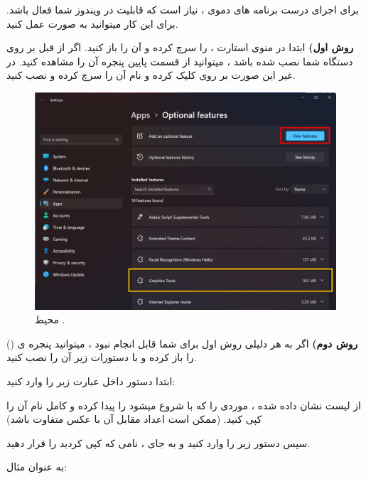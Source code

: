 {
    \Large
    برای اجرای درست برنامه های دموی  ، نیاز است که قابلیت  در ویندوز شما فعال باشد.
    برای این کار میتوانید به صورت عمل کنید.

    \textbf{روش اول)}
    ابتدا در منوی استارت ،  را سرچ کرده و آن را باز کنید.
    اگر  از قبل بر روی دستگاه شما نصب شده باشد ، میتوانید از قسمت پایین پنجره آن را مشاهده کنید.
    در غیر این صورت بر روی  کلیک کرده و نام آن را سرچ کرده و نصب کنید.

    \begin{figure}[H]
        \centering
        \setlength{\belowcaptionskip}{-10pt}
        \includegraphics[width=\textwidth]{Images/1.Intro.4.1.png}
        \caption{محیط .}
    \end{figure}

    \textbf{روش دوم)}
    اگر به هر دلیلی روش اول برای شما قابل انجام نبود ، میتوانید پنجره ی  () را باز کرده و با دستورات زیر آن را نصب کنید.

    ابتدا دستور داخل  عبارت زیر را وارد کنید:

    \begin{flushleft}
    \end{flushleft}

    از لیست نشان داده شده ، موردی را که با  شروع میشود را پیدا کرده و کامل نام آن را کپی کنید. (ممکن است اعداد مقابل آن با عکس متفاوت باشد)

    سپس دستور زیر را وارد کنید و به جای  ، نامی که کپی کردید را قرار دهید.

    \begin{flushleft}
    \end{flushleft}

    به عنوان مثال:

    \begin{flushleft}
        \normalsize
    \end{flushleft}
}
\textbf{\vspace{25pt}}

